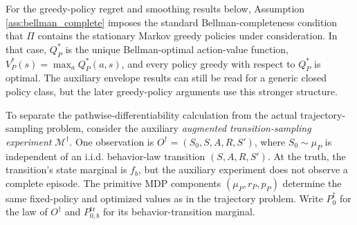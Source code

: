 \documentclass[12pt]{article}
\theoremstyle{remark}\newtheorem{remark}[theorem]{Remark}\theoremstyle{plain}
\begin{document}
For the greedy-policy regret and smoothing results below, Assumption
\ref{ass:bellman_complete} imposes the standard Bellman-completeness
condition that $\Pi$ contains the stationary Markov greedy policies
under consideration.  In that case,
$Q_P^*$ is the unique Bellman-optimal action-value function,
$V_P^*(s)=\max_aQ_P^*(a,s)$, and every policy greedy with respect to
$Q_P^*$ is optimal.  The auxiliary envelope results can still be read
for a generic closed policy class, but the later greedy-policy
arguments use this stronger structure.



To separate the pathwise-differentiability calculation from the
actual trajectory-sampling problem, consider the auxiliary
\emph{augmented transition-sampling experiment}
$\mathcal M^\dagger$.  One observation is
$O^\dagger=(S_0,S,A,R,S')$, where $S_0\sim\mu_P$ is independent of
an i.i.d. behavior-law transition $(S,A,R,S')$.  At the truth, the
transition's state marginal is $f_b$, but the auxiliary experiment
does not observe a complete episode.  The primitive MDP components
$(\mu_P,r_P,p_P)$ determine the same fixed-policy and optimized values
as in the trajectory problem.
Write $P_0^\dagger$ for the law of $O^\dagger$ and
$P_{0,b}^{\mathrm{tr}}$ for its behavior-transition marginal.
\end{document}
